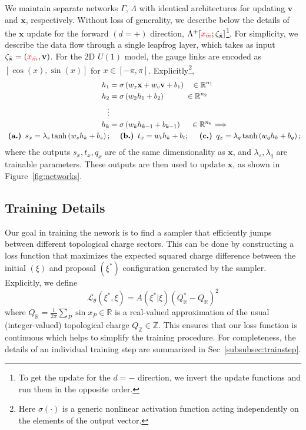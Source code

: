 \documentclass[a4paper,11pt]{article}
\newcommand{\x}{\mathbf{x}}
\newcommand{\p}{\mathbf{v}}
\newcommand{\xmaskbar}{\textcolor{red}{x_{\bar{m}}}}
\begin{document}
We maintain separate networks \(\Gamma\), \(\Lambda\) with identical
architectures for updating \(\p\) and \(\x\), respectively.
%
Without loss of generality, we describe below the details of the \(\x\) update
for the forward \((d = +)\) direction, \(\Lambda^{+}[\xmaskbar;
\zeta_{\bar{\x}}]\)\footnote{
    To get the update for the \(d=-\) direction, we invert the
    update functions and run them in the opposite order.
}.
%
For simplicity, we describe the data flow through a single leapfrog layer,
%
which takes as input \(\zeta_{\bar{\x}} = (\xmaskbar, \p)\).
%
For the 2D \(U(1)\) model, the gauge links are encoded as \([\cos(x),
\sin(x)]\) for \(x \in [-\pi, \pi]\).
%
Explicitly\footnote{
Here \(\sigma(\cdot)\) is a generic nonlinear activation function
acting independently on the elements of the output vector.
},
%
\begin{align}
    h_{1} &= \sigma\left(w_{x} \x + w_{v} \p + b_{1}\right)
        \quad \in \mathbb{R}^{n_{1}} \\
    h_{2} &= \sigma\left(w_{2} h_{1} + b_{2}\right)
        \hspace{0.085\textwidth} \in \mathbb{R}^{n_{2}} \\
    \nonumber \vdots & \\
    h_{k} &= \sigma\left(w_{k} h_{k-1} + b_{k-1}\right)
        \hspace{0.04\textwidth} \in \mathbb{R}^{n_{k}} \Longrightarrow \\
    \nonumber
    \textbf{  (a.)  } s_{x} = \lambda_{s} \tanh \left( w_{s} h_{k} + b_{s} \right);
    &\quad\textbf{  (b.)  } t_{x} = w_{t} h_{k} + b_{t};
    \quad\textbf{  (c.)  } q_{x} = \lambda_{q}\tanh\left(w_{q} h_{k} + b_{q}\right);
\end{align}
%
where the outputs \(s_{x}, t_{x}, q_{x}\) are of the same dimensionality as
\(\x\), and \(\lambda_{s}, \lambda_{q}\) are trainable parameters.
%
These outputs are then used to update \(\x\), as shown in
Figure~\ref{fig:networks}.

\subsection{\label{subsec:training}Training Details}
%
Our goal in training the nework is to find a sampler that efficiently
jumps between different topological charge sectors.
%
This can be done by constructing a loss function that maximizes the expected
squared charge difference between the initial \((\xi)\) and proposal
\((\xi^{\ast})\) configuration generated by the sampler.
%
Explicitly, we define
%
\begin{equation}
    \mathcal{L}_{\theta}(\xi^{\ast}, \xi)
    = A(\xi^{\ast}|\xi) (Q^{\ast}_{\mathbb{R}} - Q_{\mathbb{R}})^{2}
\end{equation}
%
where \(Q_{\mathbb{R}} = \frac{1}{2\pi}\sum_{P} \sin x_{P} \in \mathbb{R}\) is
a real-valued approximation of the usual (integer-valued) topological charge
\(Q_{\mathbb{Z}} \in \mathbb{Z}\).
%
This ensures that our loss function is continuous which helps to simplify the
training procedure.
%
For completeness, the details of an individual training step are summarized in
Sec~\ref{subsubsec:trainstep}.
%
\end{document}
